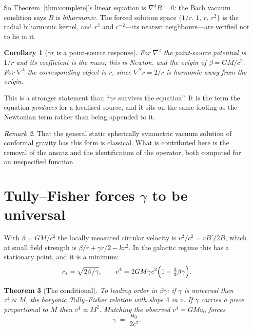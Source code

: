 \documentclass[11pt]{article}
\newtheorem{theorem}{Theorem}[section]
\newtheorem{corollary}[theorem]{Corollary}
\theoremstyle{definition}
\theoremstyle{remark}
\newtheorem{remark}[theorem]{Remark}
\begin{document}
So Theorem~\ref{thm:complete}'s linear equation is \(\nabla^{4}B=0\): the
Bach vacuum condition says \(B\) is \emph{biharmonic}.  The forced solution
space \(\{1/r,\,1,\,r,\,r^{2}\}\) is the radial biharmonic kernel, and
\(r^{3}\) and \(r^{-2}\)---its nearest neighbours---are verified not to lie
in it.

\begin{corollary}[\(\gamma r\) is a point-source response]
For \(\nabla^{2}\) the point-source potential is \(1/r\) and its coefficient
is the mass; this is Newton, and the origin of \(\beta=GM/c^{2}\).  For
\(\nabla^{4}\) the corresponding object is \(r\), since \(\nabla^{2}r=2/r\)
is harmonic away from the origin.
\end{corollary}

This is a stronger statement than ``\(\gamma r\) survives the equation''.  It
is the term the equation \emph{produces} for a localised source, and it sits
on the same footing as the Newtonian term rather than being appended to it.

\begin{remark}
That the general static spherically symmetric vacuum solution of conformal
gravity has this form is classical.  What is contributed here is the removal
of the ansatz and the identification of the operator, both computed for an
unspecified function.
\end{remark}

\section{Tully--Fisher forces \(\gamma\) to be universal}
\label{sec:tf}

With \(\beta=GM/c^{2}\) the locally measured circular velocity is
\(v^{2}/c^{2}=rB'/2B\), which at small field strength is
\(\beta/r+\gamma r/2-kr^{2}\).  In the galactic regime this has a stationary
point, and it is a minimum:
\[
  r_{*}=\sqrt{2\beta/\gamma},
  \qquad
  v^{4}=2GM\gamma c^{2}\Bigl(1-\tfrac{3}{2}\beta\gamma\Bigr).
\]

\begin{theorem}[The conditional]
\label{thm:tf}
To leading order in \(\beta\gamma\): if \(\gamma\) is universal then
\(v^{4}\propto M\), the baryonic Tully--Fisher relation with slope \(4\) in
\(v\).  If \(\gamma\) carries a piece proportional to \(M\) then
\(v^{4}\propto M^{2}\).  Matching the observed \(v^{4}=GMa_{0}\) forces
\[
  \gamma \;=\; \frac{a_{0}}{2c^{2}}.
\]
\end{theorem}
\end{document}
